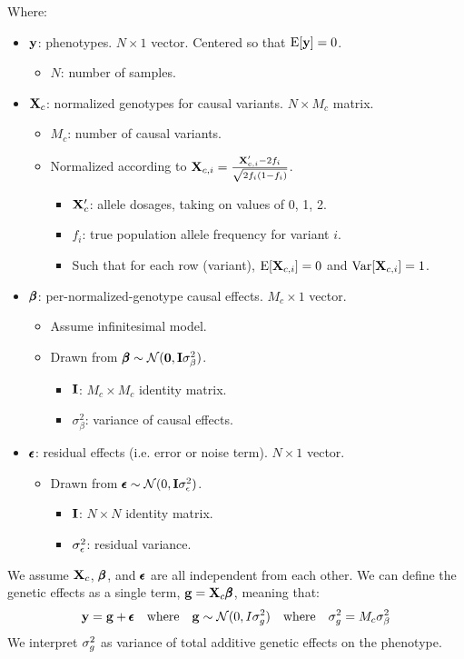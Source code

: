 \documentclass[12pt]{article}
\begin{document}
Where:
\begin{itemize}
    \item $\mathbf{y}$: phenotypes.
    $N \times 1$ vector.
    Centered so that $\mathrm{E}[\mathbf{y}]=0$.
    \begin{itemize}
        \item $N$: number of samples.
    \end{itemize}
    \item $\mathbf{X}_c$: normalized genotypes for causal variants.
    $N \times M_c$ matrix.
    \begin{itemize}
        \item $M_c$: number of causal variants.
        \item Normalized according to
        $\mathbf{X}_{c,i} =  \frac{\mathbf{X}'_{c,i} - 2 f_i}{\sqrt{2 f_i (1 - f_i)}}$.
        \begin{itemize}
            \item $\mathbf{X}_c'$: allele dosages, taking on values of 0, 1, 2.
            \item $f_i$: true population allele frequency for variant $i$.
            \item Such that for each row (variant), $\mathrm{E}[\mathbf{X}_{c,i}] = 0$ and $\mathrm{Var}[\mathbf{X}_{c,i}] = 1$.
        \end{itemize}
    \end{itemize}
    \item $\pmb{\beta}$: per-normalized-genotype causal effects.
    $M_c \times 1$ vector.
    \begin{itemize}
        \item Assume infinitesimal model.
        \item Drawn from $\pmb{\beta} \sim \mathcal{N}(\mathbf{0}, \mathbf{I} \sigma_{\beta}^2)$.
        \begin{itemize}
            \item $\mathbf{I}$: $M_c \times M_c$ identity matrix.
            \item $\sigma_{\beta}^2$: variance of causal effects.
        \end{itemize}
    \end{itemize}
    \item $\pmb{\epsilon}$: residual effects (i.e. error or noise term). $N \times 1$ vector.
    \begin{itemize}
        \item Drawn from $\pmb{\epsilon} \sim \mathcal{N}(0, \mathbf{I} \sigma_{\epsilon}^2)$.
        \begin{itemize}
            \item $\mathbf{I}$: $N \times N$ identity matrix.
            \item $\sigma_{\epsilon}^2$: residual variance.
        \end{itemize}
    \end{itemize}
\end{itemize}
We assume $\mathbf{X}_c$, $\pmb{\beta}$, and $\pmb{\epsilon}$ are all independent from each other.
We can define the genetic effects as a single term, $\mathbf{g} = \mathbf{X}_c \pmb{\beta}$, meaning that:
\begin{equation*}
\mathbf{y} = \mathbf{g} + \pmb{\epsilon}
\quad\mathrm{where}\quad
\mathbf{g} \sim \mathcal{N}(0, I \sigma_g^2)
\quad\mathrm{where}\quad
\sigma_g^2 = M_c \sigma_{\beta}^2
\end{equation*}
We interpret $\sigma_g^2$ as variance of total additive genetic effects on the phenotype.
\end{document}
